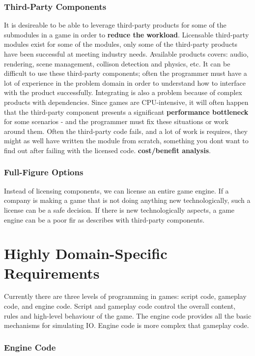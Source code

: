     \subsubsection*{Third-Party Components}
    It is desireable to be able to leverage third-party products for some of the submodules in a game in order to {\bf reduce the workload}. Licensable third-party modules exist for some of the modules, only some of the third-party products have been successful at meeting industry needs. Available products covers: audio, rendering, scene management, collison detection and physics, etc. It can be difficult to use these third-party components; often the programmer must have a lot of experience in the problem domain in order to understand how to interface with the product successfully. Integrating is also a problem because of complex products with dependencies. Since games are CPU-intensive, it will often happen that the third-party component presents a significant {\bf performance bottleneck} for some scenarios - and the programmer must fix these situations or work around them. Often the third-party code fails, and a lot of work is requires, they might as well have written the module from scratch, something you dont want to find out after failing with the licensed code. {\bf cost/benefit analysis}.

    \subsubsection*{Full-Figure Options}
    Instead of licensing components, we can license an entire game engine. If a company is making a game that is not doing anything new technologically, such a license can be a safe decision. If there is new technologically aspects, a game engine can be a poor fir as describes with third-party components.


  \section*{Highly Domain-Specific Requirements}
  Currently there are three levels of programming in games: script code, gameplay code, and engine code. Script and gameplay code control the overall content, rules and high-level behaviour of the game. The engine code provides all the basic mechanisms for simulating IO. Engine code is more complex that gameplay code. 

    \subsubsection*{Engine Code}

